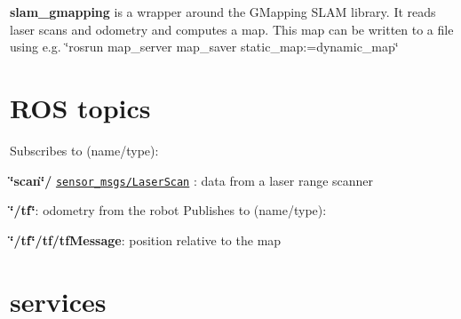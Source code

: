  {\bfseries slam\+\_\+gmapping} is a wrapper around the G\+Mapping S\+L\+AM library. It reads laser scans and odometry and computes a map. This map can be written to a file using e.\+g. \char`\"{}rosrun map\+\_\+server map\+\_\+saver static\+\_\+map\+:=dynamic\+\_\+map\char`\"{} 

 \hypertarget{index_topic}{}\section{R\+O\+S topics}\label{index_topic}
Subscribes to (name/type)\+:
\begin{DoxyItemize}
\item {\bfseries \char`\"{}scan\char`\"{}/} \href{../../sensor_msgs/html/classstd__msgs_1_1LaserScan.html}{\tt sensor\+\_\+msgs/\+Laser\+Scan} \+: data from a laser range scanner
\item {\bfseries \char`\"{}/tf\char`\"{}}\+: odometry from the robot Publishes to (name/type)\+:
\item {\bfseries \char`\"{}/tf\char`\"{}/tf/tf\+Message}\+: position relative to the map 
\end{DoxyItemize}\hypertarget{index_services}{}\section{services}\label{index_services}

